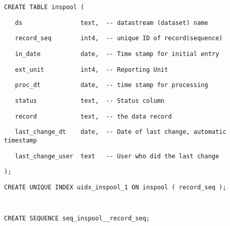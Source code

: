 %
\begin{table}[htbp]

\caption{INSPOOL Structure\label{tab:INSPOOL-Structure}}

\texttt{\scriptsize CREATE TABLE inspool (}{\scriptsize \par}

\texttt{\scriptsize ~~ ds~~~~~~~~~~~~~~~ text,~
-{}- datastream (dataset) name}{\scriptsize \par}

\texttt{\scriptsize ~~ record\_seq~~~~~~~ int4,~ -{}- unique
ID of record(sequence)}{\scriptsize \par}

\texttt{\scriptsize ~~ in\_date~~~~~~~~~~ date,~ -{}-
Time stamp for initial entry}{\scriptsize \par}

\texttt{\scriptsize ~~ ext\_unit~~~~~~~~~ int4,~ -{}-
Reporting Unit}{\scriptsize \par}

\texttt{\scriptsize ~~ proc\_dt~~~~~~~~~~ date,~ -{}-
time stamp for processing}{\scriptsize \par}

\texttt{\scriptsize ~~ status~~~~~~~~~~~ text,~ -{}-
Status column}{\scriptsize \par}

\texttt{\scriptsize ~~ record~~~~~~~~~~~ text,~ -{}-
the data record}{\scriptsize \par}

\texttt{\scriptsize ~~ last\_change\_dt~~~ date,~ -{}- Date
of last change, automatic timestamp}{\scriptsize \par}

\texttt{\scriptsize ~~ last\_change\_user~ text~~ -{}- User who
did the last change}{\scriptsize \par}

\texttt{\scriptsize );}{\scriptsize \par}

\texttt{\scriptsize CREATE UNIQUE INDEX uidx\_inspool\_1 ON inspool
( record\_seq );}{\scriptsize \par}

\begin{center}\texttt{\scriptsize ~}\end{center}{\scriptsize \par}

\texttt{\scriptsize CREATE SEQUENCE seq\_inspool\_\_record\_seq;}{\scriptsize \par}


\end{table}
